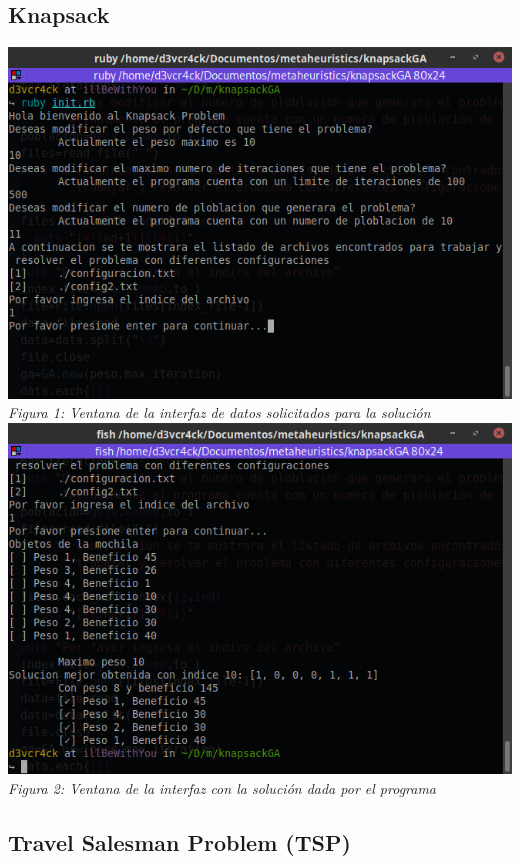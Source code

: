 \documentclass[10pt]{article}
\begin{document}
\subsection{Knapsack}
\begin{center}
  \includegraphics[scale=0.5]{imgs/ventana-knapsack.png}
  \\\textit{Figura 1: Ventana de la interfaz de datos solicitados para la solución}
  \\
  \includegraphics[scale=0.5]{imgs/ventana-knapsack-sol.png}
  \\\textit{Figura 2: Ventana de la interfaz con la solución dada por el programa}
\end{center}

\subsection{Travel Salesman Problem (TSP)}
\end{document}
